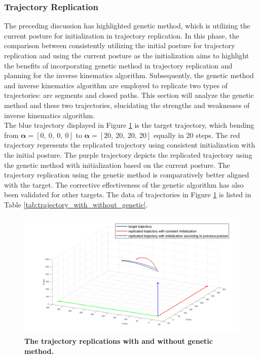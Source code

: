 \subsubsection{Trajectory Replication}
The preceding discussion has highlighted genetic method, which is utilizing the current posture for 
initialization in trajectory replication. In this phase, the comparison between consistently utilizing the 
initial posture for trajectory replication and using the current posture as the initialization aims to 
highlight the benefits of incorporating genetic method in trajectory replication and planning for the inverse 
kinematics algorithm. Subsequently, the genetic method and inverse kinematics algorithm are employed to 
replicate two types of trajectories: arc segments and closed paths. This section will analyze the genetic 
method and these two trajectories, elucidating the strengths and weaknesses of inverse kinematics algorithm. \\
The blue trajectory displayed in Figure \ref{fig:genetic_approach} is the target trajectory, which bending from 
$\boldsymbol{\alpha} = [0,\ 0,\ 0,\ 0]$ to $\boldsymbol{\alpha} = [20,\ 20,\ 20,\ 20]$ equally in 20 steps. 
The red trajectory represents the replicated trajectory using consistent initialization with the initial 
posture. The purple trajectory depicts the replicated trajectory using the genetic method with initialization 
based on the current posture. The trajectory replication using the genetic method is comparatively better 
aligned with the target. The corrective effectiveness of the genetic algorithm has also been validated for 
other targets. The data of trajectories in Figure \ref{fig:genetic_approach} is listed in Table 
\ref{tab:trajectory_with_without_genetic}.
\begin{figure}[H] %
    \centering %
    \captionsetup{labelsep=colon}
    \includegraphics[width=1.0\textwidth]{Image/Result/trajectory_replication_diff_initialization.png} 
    \caption[The trajectory replications with and without genetic method]
    {\centering \textbf{The trajectory replications with and without genetic method.}}
    \label{fig:genetic_approach}
\end{figure}
